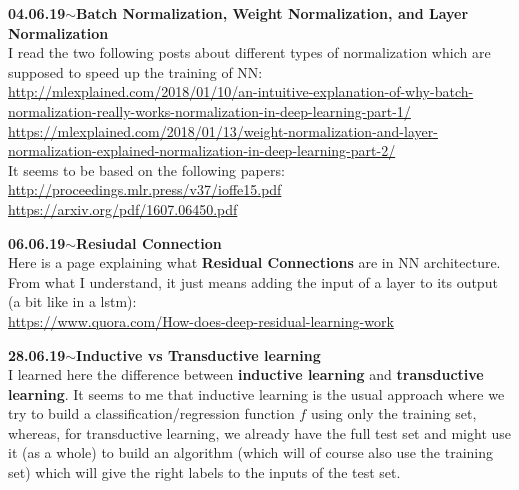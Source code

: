 \documentclass[11pt,a4paper]{article}
\newenvironment{loggentry}[2]%
{\noindent\textbf{#1}\hspace{1cm}$\mathbf{\sim}$\text{ }\textbf{#2}\\}{\vspace{0.5cm}}
\begin{document}
\begin{loggentry}{04.06.19}{Batch Normalization, Weight Normalization, and Layer Normalization}

I read the two following posts about different types of normalization which are supposed to speed up the training of NN:\\
\url{http://mlexplained.com/2018/01/10/an-intuitive-explanation-of-why-batch-normalization-really-works-normalization-in-deep-learning-part-1/}\\
\url{https://mlexplained.com/2018/01/13/weight-normalization-and-layer-normalization-explained-normalization-in-deep-learning-part-2/}\\
It seems to be based on the following papers:\\
\url{http://proceedings.mlr.press/v37/ioffe15.pdf}\\
\url{https://arxiv.org/pdf/1607.06450.pdf}\\

\end{loggentry}


\begin{loggentry}{06.06.19}{Resiudal Connection}

Here is a page explaining what \textbf{Residual Connections} are in NN architecture. From what I understand, it just means adding the input of a layer to its output (a bit like in a lstm):\\
\url{https://www.quora.com/How-does-deep-residual-learning-work}\\

\end{loggentry}


\begin{loggentry}{28.06.19}{Inductive vs Transductive learning}

I learned here the difference between \textbf{inductive learning} and \textbf{transductive learning}. It seems to me that inductive learning is the usual approach where we try to build a classification/regression function $f$ using only the training set, whereas, for transductive learning, we already have the full test set and might use it (as a whole) to build an algorithm (which will of course also use the training set) which will give the right labels to the inputs of the test set.

\end{loggentry}
\end{document}
